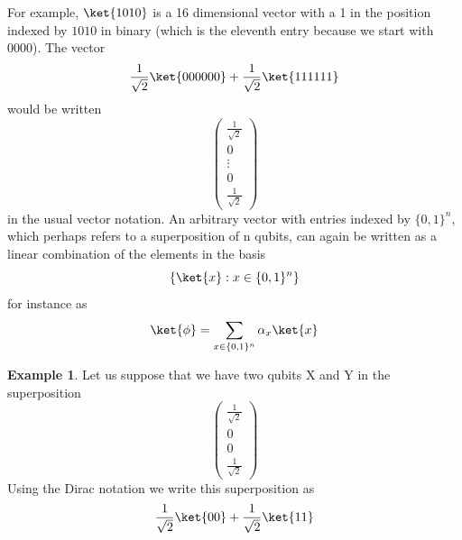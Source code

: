 \documentclass[12pt, oneside]{book}
\theoremstyle{definition}
\theoremstyle{definition}
\newtheorem{example}{Example}[section]
\theoremstyle{remark}
\begin{document}
For example, $\ket{1010}$ is a 16 dimensional vector with a 1 in the position indexed by $1010$ in binary (which is the eleventh entry because we start with 0000). The vector
\[
\frac{1}{\sqrt{2}} \ket{000000} +\frac{1}{\sqrt{2}}\ket{111111}
\]
would be written
\[
\begin{pmatrix} \frac{1}{\sqrt{2}} \\ 0 \\ \vdots \\ 0 \\\frac{1}{\sqrt{2}} \end{pmatrix}
\]
in the usual vector notation. An arbitrary vector with entries indexed by $\{0,1\}^n$, which perhaps refers to a superposition of n qubits, can again be written as a linear combination of the elements in the basis
\[
\{\ket{x}:x \in \{0,1\}^n\}
\]
for instance as
\[
\ket{\phi}=\sum_{x\in\{0,1\}^n} \alpha_x \ket{x}
\]

\begin{example}
    Let us suppose that we have two qubits X and Y in the superposition
    \[
    \begin{pmatrix} \frac{1}{\sqrt{2}} \\ 0 \\ 0 \\ \frac{1}{\sqrt{2}} \end{pmatrix}
    \]
    Using the Dirac notation we write this superposition as
    \[
    \frac{1}{\sqrt{2}}\ket{00}+\frac{1}{\sqrt{2}}\ket{11}
    \]
\end{example}
\end{document}
